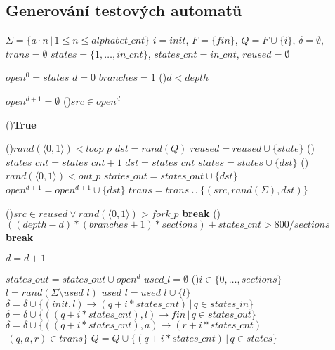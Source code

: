     \subsection{Generování testových automatů}
    \begin{algorithm}[h]
        \scriptsize
        \DontPrintSemicolon
        \setcounter{AlgoLine}{0}

        \vspace{0.2cm}

        $\Sigma = \{a \cdot n\, |\, 1 \leq n \leq alphabet\_cnt\}$\;
        $i = init$, $F = \{fin\}$, $Q = F \cup \{i\}$, $\delta = \emptyset$, $trans = \emptyset$\;
        $states = \{1, \dots, in\_cnt\}$, $states\_cnt = in\_cnt$, $reused = \emptyset$\;

        $open^0 = states$\;
        $d = 0$\;
        $branches = 1$\;
        \While(){$d < depth$}
        {
            $open^{d+1} = \emptyset$\;
            \ForAll(){$src \in open^d$}
            {
                \While(){\textnormal{\textbf{True}}}
                {
                    \eIf(){$rand(\langle 0, 1\rangle) < loop\_p$}
                    {
                        $dst = rand(Q)$\;
                        $reused = reused \cup \{state\}$\;
                    }()
                    {
                        $states\_cnt = states\_cnt + 1$\;
                        $dst = states\_cnt$\;
                        $states = states \cup \{dst\}$\;
                        \If(){$rand(\langle 0, 1\rangle) < out\_p$}
                        {
                            $states\_out = states\_out \cup \{dst\}$
                        }
                    }
                    $open^{d+1} = open^{d+1} \cup \{dst\}$\;
                    $trans = trans \cup \{(src, rand(\Sigma), dst)\}$\;

                    \If(){$src \in reused \lor rand(\langle 0, 1\rangle) > fork\_p$}
                    {
                        \textbf{break}
                    }
                    \If(){$((depth - d)*(branches + 1)*sections) + states\_cnt > 800/sections$}
                    {
                        \textbf{break}
                    }
                }
            }
            $d = d + 1$\;
        }
        $states\_out = states\_out \cup open^{d}$\;
        $used\_l = \emptyset$\;
        \ForAll(){$i \in \{0,\dots,sections\}$}
        {
            $l = rand(\Sigma \setminus used\_l)$\;
            $used\_l = used\_l \cup \{l\}$\;
            $\delta = \delta \cup \{(init, l) \rightarrow (q+i*states\_cnt)\,|\, q \in states\_in\}$\;
            $\delta = \delta \cup \{((q+i*states\_cnt), l) \rightarrow fin\,|\, q \in states\_out\}$\;
            $\delta = \delta \cup \{((q+i*states\_cnt), a) \rightarrow (r+i*states\_cnt)\,|$\\\hspace{1.07cm}$\, (q, a, r) \in trans \}$\;
            $Q = Q \cup \{(q+i*states\_cnt)\,|\, q \in states\}$\;
        }


\end{algorithm}
